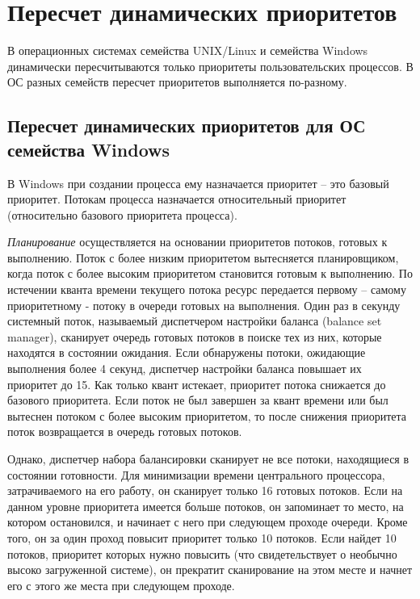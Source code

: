 \documentclass[12pt]{report}
\begin{document}
\chapter{Пересчет динамических приоритетов}

В операционных системах семейства UNIX/Linux и семейства Windows динамически пересчитываются только приоритеты пользовательских процессов. В ОС разных семейств пересчет приоритетов выполняется по-разному.

\section{Пересчет динамических приоритетов для ОС семейства Windows}

В Windows при создании процесса ему назначается приоритет – это базовый приоритет. Потокам процесса назначается относительный приоритет (относительно базового приоритета процесса). 

\textit{Планирование} осуществляется на основании приоритетов потоков, готовых к выполнению. Поток с более низким приоритетом вытесняется планировщиком, когда поток с более высоким приоритетом становится готовым к выполнению. По истечении кванта времени текущего потока ресурс передается первому – самому приоритетному - потоку в очереди готовых на выполнения. 
Один раз в секунду системный поток, называемый диспетчером настройки баланса (balance set manager), сканирует очередь готовых потоков в поиске тех из них, которые находятся в состоянии ожидания. Если обнаружены потоки, ожидающие выполнения более 4 секунд, диспетчер настройки баланса повышает их приоритет до 15. Как только квант истекает, приоритет потока снижается до базового приоритета. Если поток не был завершен за квант времени или был вытеснен потоком с более высоким приоритетом, то после снижения приоритета поток возвращается в очередь готовых потоков.

Однако, диспетчер набора балансировки сканирует не все потоки, находящиеся в состоянии готовности. Для минимизации времени центрального процессора, затрачиваемого на его работу, он сканирует только 16 готовых потоков. Если на данном уровне приоритета имеется больше потоков, он запоминает то место, на котором остановился, и начинает с него при следующем проходе очереди. Кроме того, он за один проход повысит приоритет только 10 потоков. Если найдет 10 потоков, приоритет которых нужно повысить (что свидетельствует о необычно высоко загруженной системе), он прекратит сканирование на этом месте и начнет его с этого же места при следующем проходе.
\end{document}
